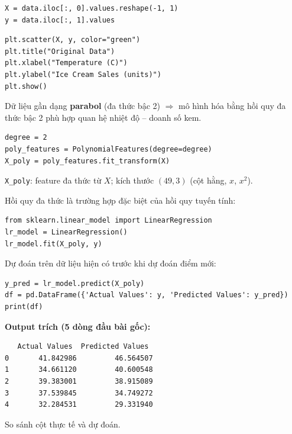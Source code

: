\begin{vidu}[title={Tách $X$ và $y$}]
\begin{lstlisting}
X = data.iloc[:, 0].values.reshape(-1, 1)
y = data.iloc[:, 1].values
\end{lstlisting}
\end{vidu}

\begin{vidu}[title={Trực quan dữ liệu gốc}]
\begin{lstlisting}
plt.scatter(X, y, color="green")
plt.title("Original Data")
plt.xlabel("Temperature (C)")
plt.ylabel("Ice Cream Sales (units)")
plt.show()
\end{lstlisting}


\begin{ynghia}[title={Nhận xét đồ thị}]
Dữ liệu gần dạng \textbf{parabol} (đa thức bậc 2) $\Rightarrow$ mô hình hóa bằng hồi quy đa thức bậc 2 phù hợp quan hệ nhiệt độ -- doanh số kem.
\end{ynghia}
\end{vidu}

\begin{vidu}[title={Tạo đặc trưng đa thức bậc 2}]
\begin{lstlisting}
degree = 2
poly_features = PolynomialFeatures(degree=degree)
X_poly = poly_features.fit_transform(X)
\end{lstlisting}

\texttt{X\_poly}: feature đa thức từ $X$; kích thước $(49, 3)$ (cột hằng, $x$, $x^2$).
\end{vidu}

\begin{vidu}[title={Bước 2: Huấn luyện mô hình}]
Hồi quy đa thức là trường hợp đặc biệt của hồi quy tuyến tính:

\begin{lstlisting}
from sklearn.linear_model import LinearRegression
lr_model = LinearRegression()
lr_model.fit(X_poly, y)
\end{lstlisting}
\end{vidu}

\begin{vidu}[title={Bước 3: Dự đoán và kiểm tra}]
Dự đoán trên dữ liệu hiện có trước khi dự đoán điểm mới:

\begin{lstlisting}
y_pred = lr_model.predict(X_poly)
df = pd.DataFrame({'Actual Values': y, 'Predicted Values': y_pred})
print(df)
\end{lstlisting}

\textbf{Output trích (5 dòng đầu bài gốc):}
\begin{verbatim}
   Actual Values  Predicted Values
0       41.842986         46.564507
1       34.661120         40.600548
2       39.383001         38.915089
3       37.539845         34.749272
4       32.284531         29.331940
\end{verbatim}
So sánh cột thực tế và dự đoán.
\end{vidu}

